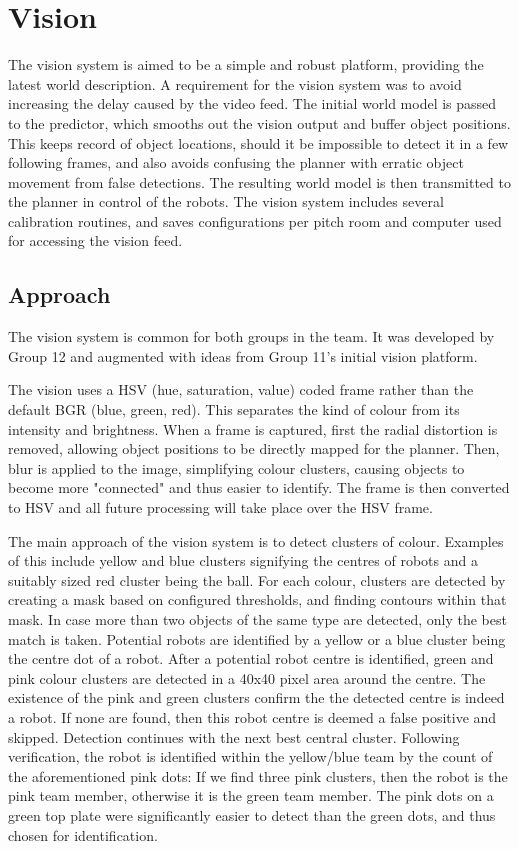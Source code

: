\section{Vision}

The vision system is aimed to be a simple and robust platform, providing the latest world description. A requirement for the vision system was to avoid increasing the delay caused by the video feed. The initial world model is passed to the predictor, which smooths out the vision output and buffer object positions. This keeps record of object locations, should it be impossible to detect it in a few following frames, and also avoids confusing the planner with erratic object movement from false detections. The resulting world model is then transmitted to the planner in control of the robots. The vision system includes several calibration routines, and saves configurations per pitch room and computer used for accessing the vision feed.

\subsection{Approach}

The vision system is common for both groups in the team. It was developed by Group 12 and augmented with ideas from Group 11's initial vision platform. 

The vision uses a HSV (hue, saturation, value) coded frame rather than the default BGR (blue, green, red). This separates the kind of colour from its intensity and brightness. When a frame is captured, first the radial distortion is removed, allowing object positions to be directly mapped for the planner. Then, blur is applied to the image, simplifying colour clusters, causing objects to become more "connected" and thus easier to identify. The frame is then converted to HSV and all future processing will take place over the HSV frame.

The main approach of the vision system is to detect clusters of colour. Examples of this include yellow and blue clusters signifying the centres of robots and a suitably sized red cluster being the ball. For each colour, clusters are detected by creating a mask based on configured thresholds, and finding contours within that mask. In case more than two objects of the same type are detected, only the best match is taken. Potential robots are identified by a yellow or a blue cluster being the centre dot of a robot. After a potential robot centre is identified, green and pink colour clusters are detected in a 40x40 pixel area around the centre. The existence of the pink and green clusters confirm the the detected centre is indeed a robot. If none are found, then this robot centre is deemed a false positive and skipped. Detection continues with the next best central cluster.  Following verification, the robot is identified within the yellow/blue team by the count of the aforementioned pink dots: If we find three pink clusters, then the robot is the pink team member, otherwise it is the green team member. The pink dots on a green top plate were significantly easier to detect than the green dots, and thus chosen for identification.

